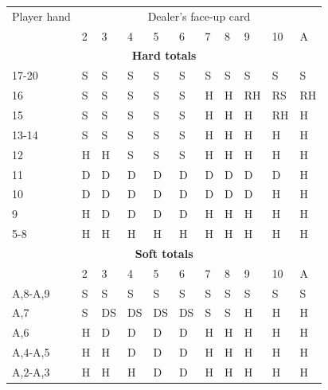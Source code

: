 \documentclass[conference]{IEEEtran}
\begin{document}
\begin{table}[ht]
\tiny
\centering
\begin{tabular}{|l|l|l|l|l|l|l|l|l|l|l|}
\hline

{Player hand} & \multicolumn{10}{c|}{Dealer's face-up card}     \\ \cline{2-11} 
                             & 2 & 3 & 4 & 5 & 6 & 7 & 8 & 9 & 10 & A \\ \hline
\multicolumn{11}{|c|}{\textbf{Hard totals}}                           \\ \hline
17-20       								 & S & S & S & S & S & S & S & S & S & S  \\ \hline
16                           & S & S & S & S & S & H & H & RH & RS & RH  \\ \hline
15                           & S & S & S & S & S & H & H & H & RH & H  \\ \hline
13-14                        & S & S & S & S & S & H & H & H & H & H  \\ \hline
12                           & H & H & S & S & S & H & H & H & H & H  \\ \hline
11                           & D & D & D & D & D & D & D & D & D & H  \\ \hline
10                           & D & D & D & D & D & D & D & D & H & H  \\ \hline
9                            & H & D & D & D & D & H & H & H & H & H  \\ \hline
5-8                          & H & H & H & H & H & H & H & H & H & H  \\ \hline

\multicolumn{11}{|c|}{\textbf{Soft totals}}                           \\ \hline
                             & 2 & 3 & 4 & 5 & 6 & 7 & 8 & 9 & 10 & A \\ \hline
A,8-A,9                      & S & S & S & S & S & S & S & S & S & S  \\ \hline
A,7                          & S & DS & DS & DS & DS & S & S & H & H & H  \\ \hline
A,6                          & H & D & D & D & D & H & H & H & H & H  \\ \hline
A,4-A,5                      & H & H & D & D & D & H & H & H & H & H  \\ \hline
A,2-A,3                      & H & H & H & D & D & H & H & H & H & H  \\ \hline


\end{tabular}
\end{table}
\end{document}

